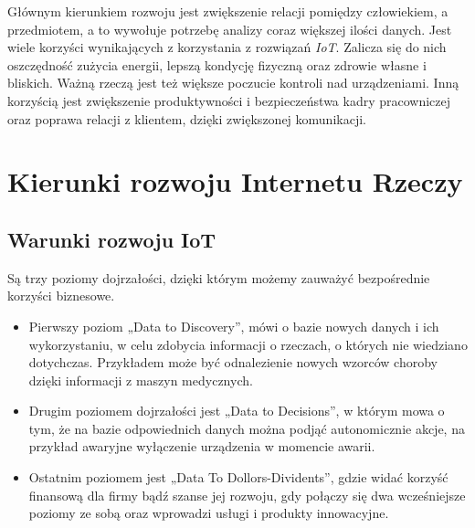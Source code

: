\documentclass[brudnopis]{xmgr}
\begin{document}
Głównym kierunkiem rozwoju jest zwiększenie relacji pomiędzy człowiekiem, a przedmiotem, a to wywołuje potrzebę analizy coraz większej ilości danych. 
Jest wiele korzyści wynikających z korzystania z rozwiązań \emph{IoT}. Zalicza się do nich oszczędność zużycia energii, lepszą kondycję fizyczną oraz zdrowie własne i bliskich. Ważną rzeczą jest też większe poczucie kontroli nad urządzeniami. Inną korzyścią jest zwiększenie produktywności i bezpieczeństwa kadry pracowniczej oraz poprawa relacji z klientem, dzięki zwiększonej komunikacji.

\chapter{Kierunki rozwoju Internetu Rzeczy}

\section{Warunki rozwoju IoT}
Są trzy poziomy dojrzałości, dzięki którym możemy zauważyć bezpośrednie korzyści biznesowe. 
\begin{itemize}
\item Pierwszy poziom „Data to Discovery”, mówi o bazie nowych danych i ich wykorzystaniu, w celu  zdobycia informacji o rzeczach, o których nie wiedziano dotychczas. Przykładem może być odnalezienie nowych wzorców choroby dzięki informacji z maszyn medycznych. 
\item Drugim poziomem dojrzałości jest „Data to Decisions”, w którym mowa o tym, że na bazie odpowiednich danych można podjąć autonomicznie akcje, na przykład awaryjne wyłączenie urządzenia w momencie awarii. 
\item Ostatnim poziomem jest „Data To Dollors-Dividents”, gdzie widać korzyść finansową dla firmy bądź szanse jej rozwoju, gdy połączy się dwa wcześniejsze poziomy ze sobą oraz wprowadzi usługi i produkty innowacyjne.
\end{itemize}
 
\end{document}
